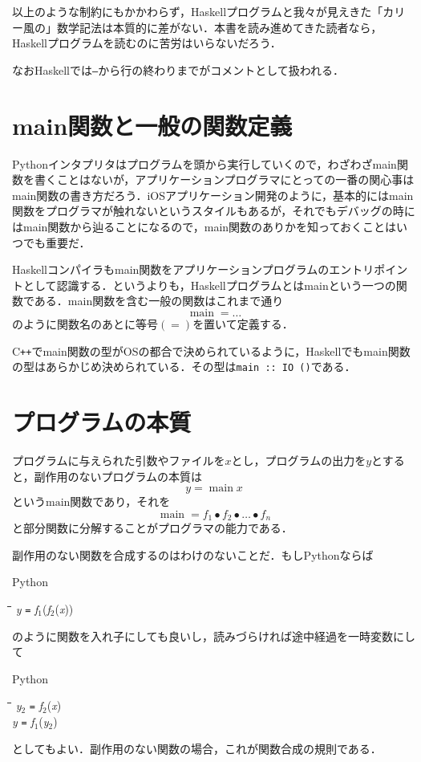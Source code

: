 \documentclass[twocolumn]{jsbook}
\newcommand{\programminglanguage}[1]{\textsf{#1}}
\newcommand{\cxx}{\programminglanguage{C}\texttt{++}}
\newcommand{\haskell}{\programminglanguage{Haskell}}
\newcommand{\python}{\programminglanguage{Python}}
\newcommand{\code}[1]{\texttt{#1}}
\newenvironment{pythoncode}{\begin{itembox}[r]{\python}}{\end{itembox}}
\newenvironment{pythontab}{\begin{tabbing}\hspace*{1em}\=\hspace*{1em}\=\hspace*{1em}\=\hspace*{1em}\=\kill}{\end{tabbing}}
\newcommand{\pthnId}[1]{\textit{#1}}
\newcommand{\pthnOp}[1]{\texttt{#1}}
\DeclareMathOperator{\mathCompose}{\bullet}
\DeclareMathOperator{\mathMain}{main}
\begin{document}
以上のような制約にもかかわらず，\haskell プログラムと我々が見えきた「カリー風の」数学記法は本質的に差がない．本書を読み進めてきた読者なら，\haskell プログラムを読むのに苦労はいらないだろう．

なお\haskell では\code{--}から行の終わりまでがコメントとして扱われる．

\section{main関数と一般の関数定義}

\python インタプリタはプログラムを頭から実行していくので，わざわざmain関数を書くことはないが，アプリケーションプログラマにとっての一番の関心事はmain関数の書き方だろう．iOSアプリケーション開発のように，基本的にはmain関数をプログラマが触れないというスタイルもあるが，それでもデバッグの時にはmain関数から辿ることになるので，main関数のありかを知っておくことはいつでも重要だ．

\haskell コンパイラもmain関数をアプリケーションプログラムのエントリポイントとして認識する．というよりも，\haskell プログラムとはmainという一つの関数である．main関数を含む一般の関数はこれまで通り
\begin{equation}
\mathMain=\dots
\end{equation}
のように関数名のあとに等号$(=)$を置いて定義する．

\cxx でmain関数の型がOSの都合で決められているように，\haskell でもmain関数の型はあらかじめ決められている．その型は\code{main :: IO ()}である．


\section{プログラムの本質}

プログラムに与えられた引数やファイルを$x$とし，プログラムの出力を$y$とすると，副作用のないプログラムの本質は
\begin{equation}
y=\mathMain x
\end{equation}
という$\text{main}$関数であり，それを
\begin{equation}
\mathMain=f_1\mathCompose f_2\mathCompose\dots\mathCompose f_n
\end{equation}
と部分関数に分解することがプログラマの能力である．

副作用のない関数を合成するのはわけのないことだ．もし\python ならば
\begin{pythoncode}
\begin{pythontab}
\pthnId{y} \pthnOp{=} \pthnId{f}${}_1$(\pthnId{f}${}_2$(\pthnId{x}))
\end{pythontab}
\end{pythoncode}
のように関数を入れ子にしても良いし，読みづらければ途中経過を一時変数にして
\begin{pythoncode}
\begin{pythontab}
\pthnId{y}${}_2$ \pthnOp{=} \pthnId{f}${}_2$(\pthnId{x})\\
\pthnId{y} \pthnOp{=} \pthnId{f}${}_1$(\pthnId{y}${}_2$)
\end{pythontab}
\end{pythoncode}
としてもよい．副作用のない関数の場合，これが関数合成の規則である．
\end{document}
